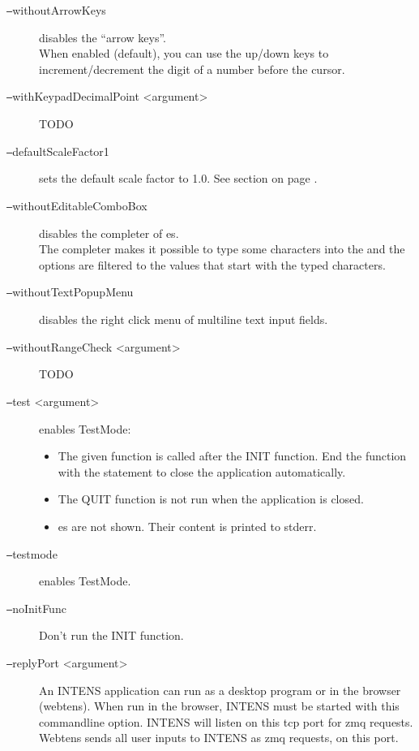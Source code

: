 \begin{description}
%
\item[\texttt{--}withoutArrowKeys] disables the ``arrow keys''. \\
  When enabled (default), you can use the up/down keys to increment/decrement
  the digit of a number before the cursor.
%
\item[\texttt{--}withKeypadDecimalPoint <argument>]
  TODO
%
\item[\texttt{--}defaultScaleFactor1] sets the default scale factor to 1.0.
  See section  on page \pageref{sec:scale}.
%
\item[\texttt{--}withoutEditableComboBox] disables the completer of \COMBOBOX{}es. \\
  The completer makes it possible to type some characters into the \COMBOBOX{} and the options
  are filtered to the values that start with the typed characters.
%
\item[\texttt{--}withoutTextPopupMenu] disables the right click menu of multiline text input fields.
%
\item[\texttt{--}withoutRangeCheck <argument>]
  TODO
%
\item[\texttt{--}test <argument>] enables TestMode:
  \begin{itemize}
  \item The given function is called after the INIT function.
        End the function with the \EXIT{} statement to close the application automatically.
  \item The QUIT function is not run when the application is closed.
  \item \MESSAGEBOX{}es are not shown. Their content is printed to stderr.
  \end{itemize}
%
\item[\texttt{--}testmode] enables TestMode.
%
\item[\texttt{--}noInitFunc] Don't run the INIT function.
%
\item[\texttt{--}replyPort <argument>]
  An INTENS application can run as a desktop program or in the browser (webtens).
  When run in the browser, INTENS must be started with this commandline option.
  INTENS will listen on this tcp port for zmq requests. Webtens sends all
  user inputs to INTENS as zmq requests, on this port. \\


\end{description}
